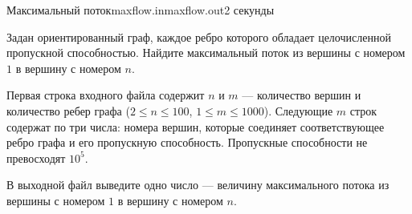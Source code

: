 \begin{problem}{Максимальный поток}{maxflow.in}{maxflow.out}{2 секунды}

Задан ориентированный граф, каждое ребро которого обладает целочисленной пропускной способностью.
Найдите максимальный поток из вершины с номером  $1$ в вершину с номером $n$.

\InputFile

Первая строка входного файла содержит $n$ и $m$ --- количество
вершин и количество ребер графа ($2 \le n \le 100$,
$1 \le m \le 1000$). 
Следующие $m$ строк содержат по три числа:
номера вершин, которые соединяет соответствующее ребро графа и его пропускную способность.
Пропускные способности не превосходят $10^5$.

\OutputFile

В выходной файл выведите одно число --- величину максимального потока  из вершины с номером  $1$ в вершину с номером $n$.

\Examples

\begin{example}
%
\end{example}

\end{problem}
                                                 
